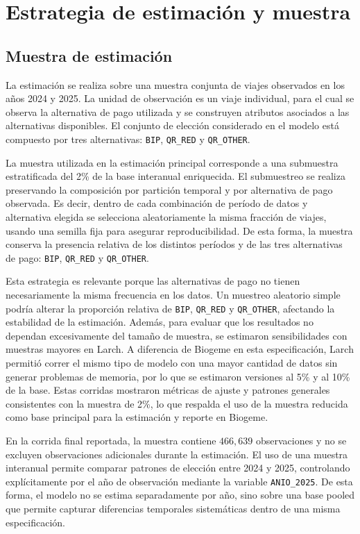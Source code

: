 \section{Estrategia de estimación y muestra}

\subsection{Muestra de estimación}

La estimación se realiza sobre una muestra conjunta de viajes observados en los años 2024 y 2025. La unidad de observación es un viaje individual, para el cual se observa la alternativa de pago utilizada y se construyen atributos asociados a las alternativas disponibles. El conjunto de elección considerado en el modelo está compuesto por tres alternativas: \texttt{BIP}, \texttt{QR\_RED} y \texttt{QR\_OTHER}.

La muestra utilizada en la estimación principal corresponde a una submuestra estratificada del 2\% de la base interanual enriquecida. El submuestreo se realiza preservando la composición por partición temporal y por alternativa de pago observada. Es decir, dentro de cada combinación de período de datos y alternativa elegida se selecciona aleatoriamente la misma fracción de viajes, usando una semilla fija para asegurar reproducibilidad. De esta forma, la muestra conserva la presencia relativa de los distintos períodos y de las tres alternativas de pago: \texttt{BIP}, \texttt{QR\_RED} y \texttt{QR\_OTHER}.

Esta estrategia es relevante porque las alternativas de pago no tienen necesariamente la misma frecuencia en los datos. Un muestreo aleatorio simple podría alterar la proporción relativa de \texttt{BIP}, \texttt{QR\_RED} y \texttt{QR\_OTHER}, afectando la estabilidad de la estimación. Además, para evaluar que los resultados no dependan excesivamente del tamaño de muestra, se estimaron sensibilidades con muestras mayores en Larch. A diferencia de Biogeme en esta especificación, Larch permitió correr el mismo tipo de modelo con una mayor cantidad de datos sin generar problemas de memoria, por lo que se estimaron versiones al 5\% y al 10\% de la base. Estas corridas mostraron métricas de ajuste y patrones generales consistentes con la muestra de 2\%, lo que respalda el uso de la muestra reducida como base principal para la estimación y reporte en Biogeme.

En la corrida final reportada, la muestra contiene \(466{,}639\) observaciones y no se excluyen observaciones adicionales durante la estimación. El uso de una muestra interanual permite comparar patrones de elección entre 2024 y 2025, controlando explícitamente por el año de observación mediante la variable \texttt{ANIO\_2025}. De esta forma, el modelo no se estima separadamente por año, sino sobre una base pooled que permite capturar diferencias temporales sistemáticas dentro de una misma especificación.

